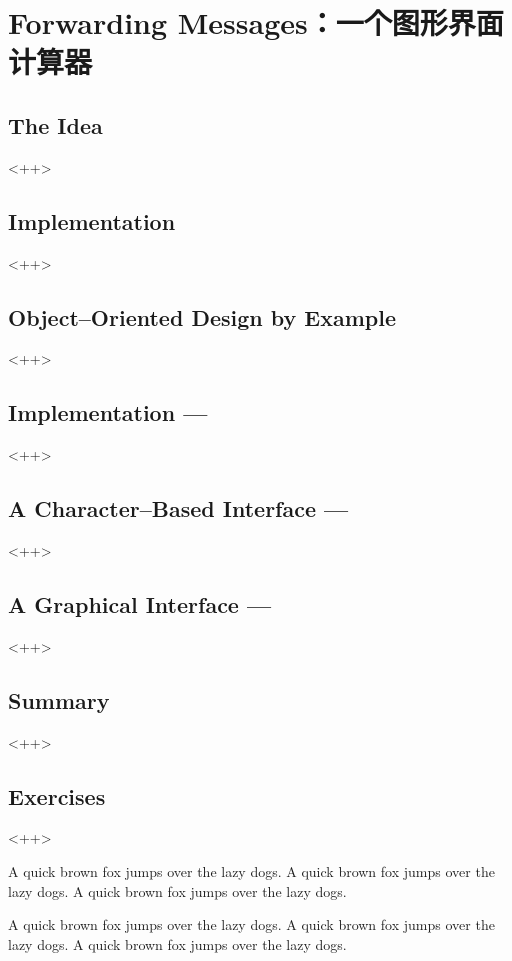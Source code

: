 

\chapter{Forwarding Messages：一个图形界面计算器}
\label{ch:ForwardingMessages}

\section{The Idea}<++>

\section{Implementation}<++>

\section{Object--Oriented Design by Example}<++>

\section{Implementation ---}<++>

\section{A Character--Based Interface ---}<++>

\section{A Graphical Interface ---}<++>

\section{Summary}<++>

\section{Exercises}<++>

A quick brown fox jumps over the lazy dogs.
A quick brown fox jumps over the lazy dogs.
A quick brown fox jumps over the lazy dogs.

A quick brown fox jumps over the lazy dogs.
A quick brown fox jumps over the lazy dogs.
A quick brown fox jumps over the lazy dogs.


